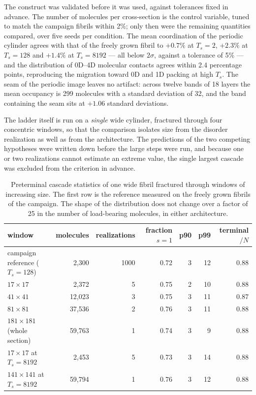 \documentclass[11pt]{article}
\begin{document}
The construct was validated before it was used, against tolerances fixed in
advance. The number of molecules per cross-section is the control variable,
tuned to match the campaign fibrils within 2\%; only then were the remaining
quantities compared, over five seeds per condition. The mean coordination of the
periodic cylinder agrees with that of the freely grown fibril to $+0.7\%$ at
$T_s=2$, $+2.3\%$ at $T_s=128$ and $+1.4\%$ at $T_s=8192$ --- all below
$2\sigma$, against a tolerance of 5\% --- and the distribution of 0D--4D
molecular contacts agrees within 2.4 percentage points, reproducing the
migration toward 0D and 1D packing at high $T_s$. The seam of the periodic image
leaves no artifact: across twelve bands of 18 layers the mean occupancy is 299
molecules with a standard deviation of 32, and the band containing the seam sits
at $+1.06$ standard deviations.

The ladder itself is run on a \textit{single} wide cylinder, fractured through
four concentric windows, so that the comparison isolates size from the disorder
realization as well as from the architecture. The predictions of the two
competing hypotheses were written down before the large steps were run, and
because one or two realizations cannot estimate an extreme value, the single
largest cascade was excluded from the criterion in advance.


\begin{table}[H]
\centering\small
\begin{tabular}{lrrrrrr}
\hline
window & molecules & realizations & fraction $s=1$ & p90 & p99 & terminal$/N$\\
\hline
campaign reference ($T_s=128$) & 2,300 & 1000 & 0.72 & 3 & 12 & 0.88\\
$17\times17$                   & 2,372 &    5 & 0.75 & 2 & 10 & 0.88\\
$41\times41$                   & 12,023 &   3 & 0.75 & 3 & 11 & 0.87\\
$81\times81$                   & 37,536 &   2 & 0.76 & 3 & 11 & 0.88\\
$181\times181$ (whole section) & 59,763 &   1 & 0.74 & 3 &  9 & 0.88\\
$17\times17$ at $T_s=8192$     & 2,453 &    5 & 0.73 & 3 & 14 & 0.88\\
$141\times141$ at $T_s=8192$   & 59,794 &   1 & 0.76 & 3 & 12 & 0.88\\
\hline
\end{tabular}
\caption{Preterminal cascade statistics of one wide fibril fractured through
windows of increasing size. The first row is the reference measured on the
freely grown fibrils of the campaign. The shape of the distribution does not
change over a factor of 25 in the number of load-bearing molecules, in either
architecture.}
\end{table}
\end{document}
